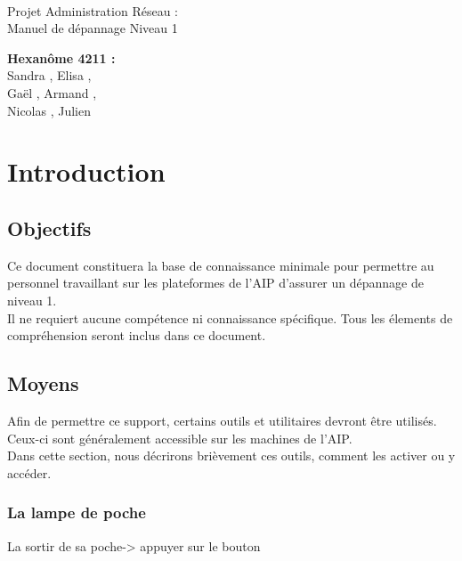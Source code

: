 \documentclass[a4paper]{article}
\begin{document}
\begin{titlepage}
	~ 
	\vfill
	\begin{center}
		\begin{Huge}
			Projet Administration Réseau : \\ Manuel de dépannage Niveau 1\\
		\end{Huge}
	\vfill
		\textbf{Hexanôme 4211 :} 
			\\Sandra {}, Elisa , 
			\\Gaël , Armand , 
			\\Nicolas {}, Julien \\
	\vfill
	\end{center}
	\vfill
\end{titlepage}

\newpage
\tableofcontents
\newpage


\section{Introduction}
\subsection{Objectifs}
Ce document constituera la base de connaissance minimale pour permettre au personnel travaillant sur les plateformes de l'AIP d'assurer un dépannage de niveau 1.\\
Il ne requiert aucune compétence ni connaissance spécifique. Tous les élements de compréhension seront inclus dans ce document.
\subsection{Moyens}
Afin de permettre ce support, certains outils et utilitaires devront être utilisés. Ceux-ci sont généralement accessible sur les machines de l'AIP.\\
Dans cette section, nous décrirons brièvement ces outils, comment les activer ou y accéder.

\subsubsection{La lampe de poche}
La sortir de sa poche-> appuyer sur le bouton
\end{document}
